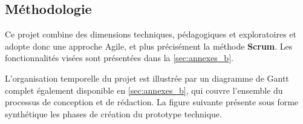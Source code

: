 \subsection{Méthodologie} \label{sec:méthodologie}

Ce projet combine des dimensions techniques, pédagogiques et exploratoires et adopte donc une approche Agile, et plus précisément la méthode \textbf{Scrum}.  
Les fonctionnalités visées sont présentées dans la \autoref{sec:annexes_b}.

L'organisation temporelle du projet est illustrée par un diagramme de Gantt complet également disponible en \autoref{sec:annexes_b}, qui couvre l’ensemble du processus de conception et de rédaction.
La figure suivante présente sous forme synthétique les phases de création du prototype technique.

